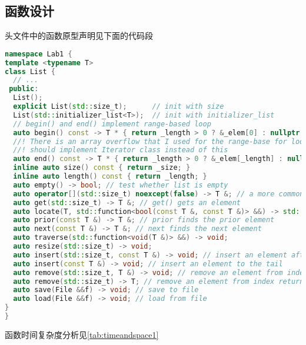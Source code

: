 \subsection{函数设计}
头文件中的函数原型声明见下面的代码段
\begin{lstlisting}[language=c++,float,floatplacement=h]
namespace Lab1 {
template <typename T>
class List {
  // ...
 public:
  List();
  explicit List(std::size_t);      // init with size
  List(std::initializer_list<T>);  // init with initializer_list
  // begin() and end() implement range-based loop
  auto begin() const -> T * { return _length > 0 ? &_elem[0] : nullptr; }
  //! There is an array overflow that I used for the range-base for loop
  //! should implement Iterator class instead of this
  auto end() const -> T * { return _length > 0 ? &_elem[_length] : nullptr; }
  inline auto size() const { return _size; }
  inline auto length() const { return _length; }
  auto empty() -> bool; // test whether list is empty
  auto operator[](std::size_t) noexcept(false) -> T &; // a more common way to get and set elements
  auto get(std::size_t) -> T &; // get() gets an element
  auto locate(T, std::function<bool(const T &, const T &)> &&) -> std::size_t; // locate() finds an element
  auto prior(const T &) -> T &; // prior finds the prior element
  auto next(const T &) -> T &; // next finds the next element
  auto traverse(std::function<void(T &)> &&) -> void;
  auto resize(std::size_t) -> void;
  auto insert(std::size_t, const T &) -> void; // insert an element after the index
  auto insert(const T &) -> void; // insert an element to the tail
  auto remove(std::size_t, T &) -> void; // remove an element from index, returning by param
  auto remove(std::size_t) -> T; // remove an element from index returning by return value
  auto save(File &&f) -> void; // save to file
  auto load(File &&f) -> void; // load from file
}
}
\end{lstlisting}\label{code:header1}
\par
函数时间复杂度分析见\autoref{tab:timeandspace1}
